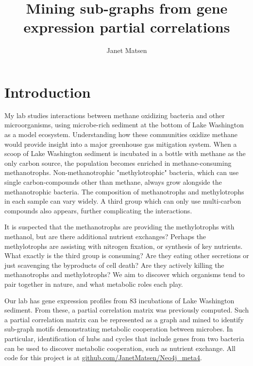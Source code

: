 \documentclass[12pt]{article}
\begin{document}
 
\title{Mining sub-graphs from gene expression partial correlations}
\author{Janet Matsen}
\maketitle

\section{Introduction} %

My lab studies interactions between methane oxidizing bacteria and other microorganisms, using microbe-rich sediment at the bottom of Lake Washington as a model ecosystem. 
Understanding how these communities oxidize methane would provide insight into a major greenhouse gas mitigation system. 
When a scoop of Lake Washington sediment is incubated in a bottle with methane as the only carbon source, the population becomes enriched in methane-consuming methanotrophs.
Non-methanotrophic "methylotrophic" bacteria, which can use single carbon-compounds other than methane, always grow alongside the methanotrophic bacteria.
The composition of methanotrophs and methylotrophs in each sample can vary widely.
A third group which can only use multi-carbon compounds also appears, further complicating the interactions.

It is suspected that the methanotrophs are providing the methylotrophs with methanol, but are there additional nutrient exchanges?
Perhaps the methylotrophs are assisting with nitrogen fixation, or synthesis of key nutrients. 
What exactly is the third group is consuming?  
Are they eating other secretions or just scavenging the byproducts of cell death?
Are they actively killing the methanotrophs and methylotrophs?
We aim to discover which organisms tend to pair together in nature, and what metabolic roles each play. 

Our lab has gene expression profiles from 83 incubations of Lake Washington sediment. 
From these, a partial correlation matrix was previously computed. 
Such a partial correlation matrix can be represented as a graph and mined to identify sub-graph motifs demonstrating metabolic cooperation between microbes. 
In particular, identification of hubs and cycles that include genes from two bacteria can be used to discover metabolic cooperation, such as nutrient exchange. 
All code for this project is at \href{https://github.com/JanetMatsen/Neo4j_meta4}{github.com/JanetMatsen/Neo4j\_meta4}.
\end{document}
